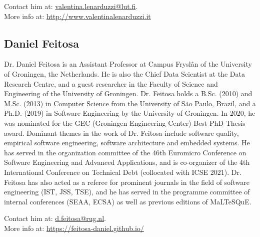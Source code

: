 \medskip
\noindent 
Contact him at: \href{mailto:valentina.lenarduzzi@lut.fi}{valentina.lenarduzzi@lut.fi}.\\
More info at: \url{http://www.valentinalenarduzzi.it}

\subsection{Daniel Feitosa}
Dr. Daniel Feitosa is an Assistant Professor at Campus Fryslân of the University of Groningen, the Netherlands. He is also the Chief Data Scientist at the Data Research Centre, and a guest researcher in the Faculty of Science and Engineering of the University of Groningen. 
Dr. Feitosa holds a B.Sc. (2010) and M.Sc. (2013) in Computer Science from the University of São Paulo, Brazil, and a Ph.D. (2019) in Software Engineering by the University of Groningen. In 2020, he was nominated for the GEC (Groningen Engineering Center) Best PhD Thesis award. Dominant themes in the work of Dr. Feitosa include software quality, empirical software engineering, software architecture and embedded systems.
He has served in the organization committee of the 46th Euromicro Conference on Software Engineering and Advanced Applications, and is co-organizer of the 4th International Conference on Technical Debt (collocated with ICSE 2021). Dr. Feitosa has also acted as a referee for prominent journals in the field of software engineering (IST, JSS, TSE), and he has served in the programme committee of internal conferences (SEAA, ECSA) as well as previous editions of MaLTeSQuE.

\medskip
\noindent Contact him at: \href{mailto:d.feitosa@rug.nl}{d.feitosa@rug.nl}.\\
More info at: \url{https://feitosa-daniel.github.io/}\\


